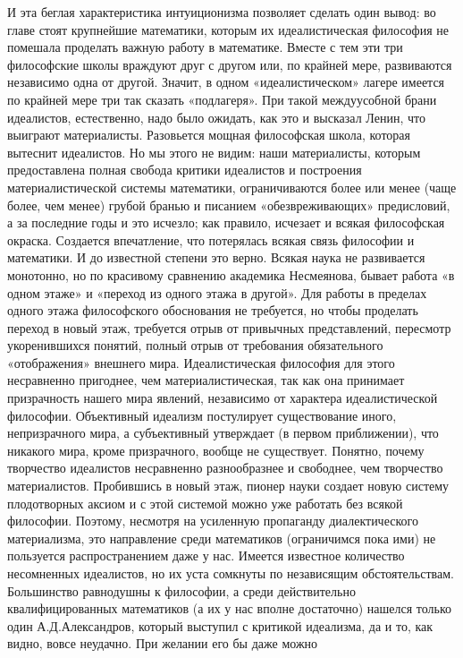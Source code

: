 И эта беглая характеристика интуиционизма позволяет сделать один
вывод: во главе стоят крупнейшие математики, которым их
идеалистическая философия не помешала проделать важную работу в
математике. Вместе с тем эти три философские школы враждуют друг с
другом или, по крайней мере, развиваются независимо одна от другой.
Значит, в одном «идеалистическом» лагере имеется по крайней мере три
так сказать «подлагеря». При такой междуусобной брани идеалистов,
естественно, надо было ожидать, как это и высказал Ленин, что выиграют
материалисты. Разовьется мощная философская школа, которая вытеснит
идеалистов. Но мы этого не видим: наши материалисты, которым
предоставлена полная свобода критики идеалистов и построения
материалистической системы математики, ограничиваются более или менее
(чаще более, чем менее) грубой бранью и писанием «обезвреживающих»
предисловий, а за последние годы и это исчезло; как правило, исчезает
и всякая философская окраска. Создается впечатление, что потерялась
всякая связь философии и математики. И до известной степени это верно.
Всякая наука не развивается монотонно, но по красивому сравнению
академика Несмеянова, бывает работа «в одном этаже» и «переход из
одного этажа в другой». Для работы в пределах одного этажа
философского обоснования не требуется, но чтобы проделать переход в
новый этаж, требуется отрыв от привычных представлений, пересмотр
укоренившихся понятий, полный отрыв от требования обязательного
«отображения» внешнего мира. Идеалистическая философия для этого
несравненно пригоднее, чем материалистическая, так как она принимает
призрачность нашего мира явлений, независимо от характера
идеалистической философии. Объективный идеализм постулирует
существование иного, непризрачного мира, а субъективный утверждает (в
первом приближении), что никакого мира, кроме призрачного, вообще не
существует. Понятно, почему творчество идеалистов несравненно
разнообразнее и свободнее, чем творчество материалистов. Пробившись в
новый этаж, пионер науки создает новую систему плодотворных аксиом и с
этой системой можно уже работать без всякой философии. Поэтому,
несмотря на усиленную пропаганду диалектического материализма, это
направление среди математиков (ограничимся пока ими) не пользуется
распространением даже у нас. Имеется известное количество несомненных
идеалистов, но их уста сомкнуты по независящим обстоятельствам.
Большинство равнодушны к философии, а среди действительно
квалифицированных математиков (а их у нас вполне достаточно) нашелся
только один А.Д.Александров, который выступил с критикой идеализма, да
и то, как видно, вовсе неудачно. При желании его бы даже можно
